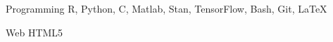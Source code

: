 

\begin{cvskills}

  \cvskill
    {Programming} %
    {R, Python, C, Matlab, Stan, TensorFlow, Bash, Git, \LaTeX} %

  \cvskill
    {Web} %
    {HTML5} %

\end{cvskills}
